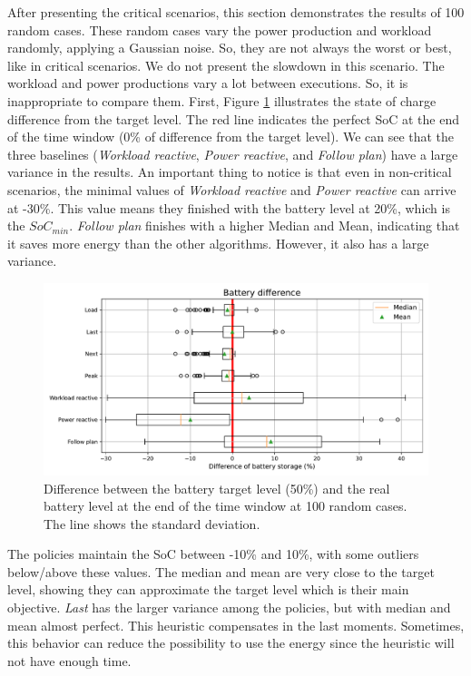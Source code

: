 After presenting the critical scenarios, this section demonstrates the results of 100 random cases. These random cases vary the power production and workload randomly, applying a Gaussian noise. So, they are not always the worst or best, like in critical scenarios. We do not present the slowdown in this scenario. The workload and power productions vary a lot between executions. So, it is inappropriate to compare them. First, Figure \ref{fig:SoC_diff} illustrates the state of charge difference from the target level. The red line indicates the perfect SoC at the end of the time window (0\% of difference from the target level). We can see that the three baselines (\emph{Workload reactive}, \emph{Power reactive}, and \emph{Follow plan}) have a large variance in the results. An important thing to notice is that even in non-critical scenarios, the minimal values of \emph{Workload reactive} and \emph{Power reactive} can arrive at -30\%. This value means they finished with the battery level at 20\%, which is the $SoC_{min}$. \emph{Follow plan} finishes with a higher Median and Mean, indicating that it saves more energy than the other algorithms. However, it also has a large variance.

\begin{figure}[!htb]
    \centering
    \includegraphics[scale=0.55]{Images/Compensations/battery_diff.pdf}
    \caption[Difference between the battery target level (50\%) and the real battery level at the end of the time window at 100 random cases.]{Difference between the battery target level (50\%) and the real battery level at the end of the time window at 100 random cases. The line shows the standard deviation.}
    \label{fig:SoC_diff}
\end{figure}

The policies maintain the SoC between -10\% and 10\%, with some outliers below/above these values. The median and mean are very close to the target level, showing they can approximate the target level which is their main objective. \emph{Last} has the larger variance among the policies, but with median and mean almost perfect. This heuristic compensates in the last moments. Sometimes, this behavior can reduce the possibility to use the energy since the heuristic will not have enough time. 

